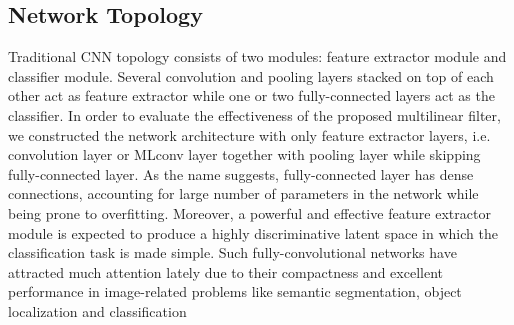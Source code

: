 \documentclass[conference,usletter]{IEEEtran}
\begin{document}
\subsection{Network Topology}
Traditional CNN topology consists of two modules: feature extractor module and classifier module. Several convolution and pooling layers stacked on top of each other act as feature extractor while one or two fully-connected layers act as the classifier. In order to evaluate the effectiveness of the proposed multilinear filter, we constructed the network architecture with only feature extractor layers, i.e. convolution layer or MLconv layer together with pooling layer while skipping fully-connected layer. As the name suggests, fully-connected layer has dense connections, accounting for large number of parameters in the network while being prone to overfitting. Moreover, a powerful and effective feature extractor module is expected to produce a highly discriminative latent space in which the classification task is made simple. Such fully-convolutional networks have attracted much attention lately due to their compactness and excellent performance in image-related problems like semantic segmentation, object localization and classification \cite{lin2013network, redmon2016you, ronneberger2015u}
\end{document}
